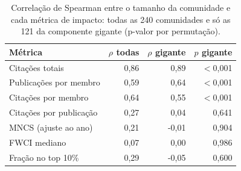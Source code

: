 \begin{table}[htbp]
\centering
\small
\caption{Correlação de Spearman entre o tamanho da comunidade e cada métrica de impacto: todas as 240 comunidades e só as 121 da componente gigante (p-valor por permutação).}
\label{tab:tamanho}
\begin{tabular}{lrrr}
\hline
Métrica & $\rho$ todas & $\rho$ gigante & $p$ gigante \\
\hline
Citações totais & 0{,}86 & 0{,}89 & $<$0{,}001 \\
Publicações por membro & 0{,}59 & 0{,}64 & $<$0{,}001 \\
Citações por membro & 0{,}64 & 0{,}55 & $<$0{,}001 \\
Citações por publicação & 0{,}27 & 0{,}04 & 0{,}641 \\
MNCS (ajuste ao ano) & 0{,}21 & -0{,}01 & 0{,}904 \\
FWCI mediano & 0{,}07 & 0{,}00 & 0{,}986 \\
Fração no top 10\% & 0{,}29 & -0{,}05 & 0{,}600 \\
\hline
\end{tabular}
\end{table}
